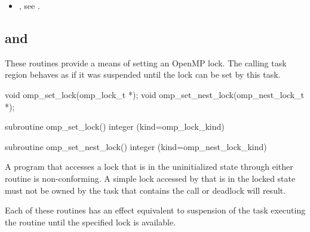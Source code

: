 \crossreferences
\begin{itemize}
\item {}, see 
.
\end{itemize}









\subsection{ and }
\label{subsec:omp_set_lock and omp_set_nest_lock}
\summary
These routines provide a means of setting an OpenMP lock. The calling
task region behaves as if it was suspended until the lock can be set
by this task.

\format
\begin{ccppspecific}
\begin{boxedcode}
void omp\_set\_lock(omp\_lock\_t *);
void omp\_set\_nest\_lock(omp\_nest\_lock\_t *);
\end{boxedcode}
\end{ccppspecific}

\begin{fortranspecific}
\begin{boxedcode}
subroutine omp\_set\_lock()
integer (kind=omp\_lock\_kind) 

subroutine omp\_set\_nest\_lock()
integer (kind=omp\_nest\_lock\_kind) 
\end{boxedcode}
\end{fortranspecific}

\constraints
A program that accesses a lock that is in the uninitialized state through either routine is 
non-conforming. A simple lock accessed by  that is in the locked state 
must not be owned by the task that contains the call or deadlock will result.

\effect
Each of these routines has an effect equivalent to suspension of the task
executing the routine until the specified lock is available. 


